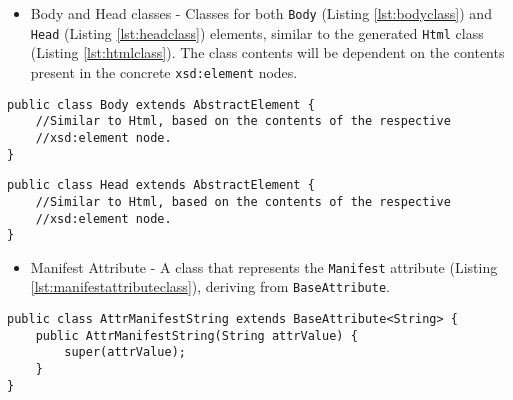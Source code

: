 \begin{itemize}
	\item Body and Head classes - Classes for both \texttt{Body} (Listing \ref{lst:bodyclass}) and \texttt{Head} (Listing \ref{lst:headclass}) elements, similar to the generated \texttt{Html} class (Listing \ref{lst:htmlclass}). The class contents will be dependent on the contents present in the concrete \texttt{xsd:element} nodes.
\end{itemize}

\bigskip

\begin{minipage}{\linewidth}
\begin{lstlisting}[caption={Body Element Class},captionpos=b,label={lst:bodyclass}]
public class Body extends AbstractElement {
    //Similar to Html, based on the contents of the respective
    //xsd:element node.
}
\end{lstlisting}
\end{minipage}

\bigskip

\begin{minipage}{\linewidth}
\begin{lstlisting}[caption={Head Element Class},captionpos=b,label={lst:headclass}]
public class Head extends AbstractElement {
    //Similar to Html, based on the contents of the respective 
    //xsd:element node.
}
\end{lstlisting}
\end{minipage}

\begin{itemize}
	\item Manifest Attribute - A class that represents the \texttt{Manifest} attribute  (Listing \ref{lst:manifestattributeclass}), deriving from \texttt{BaseAttribute}.
\end{itemize}

\bigskip


\begin{minipage}{\linewidth}
\begin{lstlisting}[caption={Manifest Attribute Class},captionpos=b,label={lst:manifestattributeclass}]
public class AttrManifestString extends BaseAttribute<String> {
    public AttrManifestString(String attrValue) {
        super(attrValue);
    }
}
\end{lstlisting}
\end{minipage}

